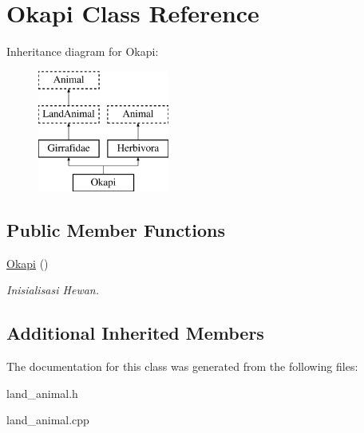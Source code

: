 \hypertarget{class_okapi}{}\section{Okapi Class Reference}
\label{class_okapi}
Inheritance diagram for Okapi\+:\begin{figure}[H]
\begin{center}
\leavevmode
\includegraphics[height=4.000000cm]{class_okapi}
\end{center}
\end{figure}
\subsection*{Public Member Functions}
\begin{DoxyCompactItemize}
\item 
\hyperlink{class_okapi_a9920604ed4f8facf8b3ce4e1cbf59995}{Okapi} ()\hypertarget{class_okapi_a9920604ed4f8facf8b3ce4e1cbf59995}{}\label{class_okapi_a9920604ed4f8facf8b3ce4e1cbf59995}

\begin{DoxyCompactList}\small\item\em Inisialisasi Hewan. \end{DoxyCompactList}\end{DoxyCompactItemize}
\subsection*{Additional Inherited Members}


The documentation for this class was generated from the following files\+:\begin{DoxyCompactItemize}
\item 
land\+\_\+animal.\+h\item 
land\+\_\+animal.\+cpp\end{DoxyCompactItemize}
